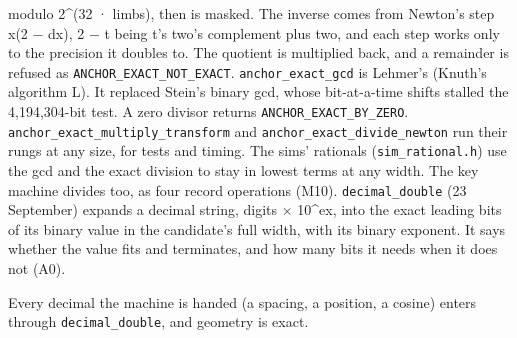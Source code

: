 \begin{description}
modulo 2\textasciicircum{}(32 · limbs), then is masked. The inverse comes from Newton's step x(2 − dx), 2 − t being t's two's complement plus two, and each step works only to the precision it doubles to. The quotient is multiplied back, and a remainder is refused as \texttt{ANCHOR\_\allowbreak{}EXACT\_\allowbreak{}NOT\_\allowbreak{}EXACT}. \texttt{anchor\_\allowbreak{}exact\_\allowbreak{}gcd} is Lehmer's (Knuth's algorithm L). It replaced Stein's binary gcd, whose bit-at-a-time shifts stalled the 4,194,304-bit test. A zero divisor returns \texttt{ANCHOR\_\allowbreak{}EXACT\_\allowbreak{}BY\_\allowbreak{}ZERO}. \texttt{anchor\_\allowbreak{}exact\_\allowbreak{}multiply\_\allowbreak{}transform} and \texttt{anchor\_\allowbreak{}exact\_\allowbreak{}divide\_\allowbreak{}newton} run their rungs at any size, for tests and timing. The sims' rationals (\texttt{sim\_\allowbreak{}rational.\allowbreak{}h}) use the gcd and the exact division to stay in lowest terms at any width. The key machine divides too, as four record operations (M10). \texttt{decimal\_\allowbreak{}double} (23 September) expands a decimal string, digits × 10\textasciicircum{}ex, into the exact leading bits of its binary value in the candidate's full width, with its binary exponent. It says whether the value fits and terminates, and how many bits it needs when it does not (A0).
\item[{wants}] Every decimal the machine is handed (a spacing, a position, a cosine) enters through \texttt{decimal\_\allowbreak{}double}, and geometry is exact.

\end{description}
